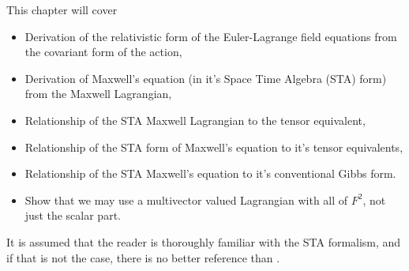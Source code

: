 %
%
This chapter will cover
\begin{itemize}
   \item Derivation of the relativistic form of the Euler-Lagrange field equations from the covariant form of the action,
   \item Derivation of Maxwell's equation (in it's Space Time Algebra (STA) form) from the Maxwell Lagrangian,
   \item Relationship of the STA Maxwell Lagrangian to the tensor equivalent,
   \item Relationship of the STA form of Maxwell's equation to it's tensor equivalents,
   \item Relationship of the STA Maxwell's equation to it's conventional Gibbs form.
   \item Show that we may use a multivector valued Lagrangian with all of \( F^2 \), not just the scalar part.
\end{itemize}

It is assumed that the reader is thoroughly familiar with the STA formalism, and if that is not the case, there is no better reference than \citep{doran2003gap}.
